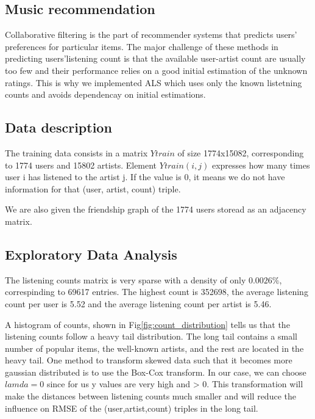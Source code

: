 \subsection{Music recommendation}
Collaborative filtering is the part of recommender systems that predicts users' preferences for particular items. The major challenge of these methods in predicting users'listening count is that the available user-artist count are usually too few and their performance relies on a good initial estimation of the unknown ratings. This is why we implemented ALS which uses only the known listetning counts and avoids dependencay on initial estimations.
\subsection{Data description}
The training data consists in a matrix $Ytrain$ of size 1774x15082, corresponding to 1774 users and 15802 artists. Element $Ytrain(i,j)$ expresses how many times user i has listened to the artist j. If the value is 0, it means we do not have information for that (user, artist, count) triple.

We are also given the friendship graph of the 1774 users storead as an adjacency matrix.

\subsection{Exploratory Data Analysis}

The listening counts matrix is very sparse with a density of only $0.0026\%$, correspinding to 
69617 entries.
The highest count is 352698, the average listening count per user is  5.52 and the average listening count per artist is 5.46.

A histogram of counts, shown in Fig\ref{fig:count_distribution} tells us that the listening counts follow a heavy tail distribution.
The long tail contains a small number of popular items, the well-known
artists, and the rest are located in the heavy tail.
One method to transform skewed data such that it becomes more gaussian distributed is to use the Box-Cox transform. In our case, we can choose $lamda=0$ since for us  y values are very high and > 0. This transformation will make the distances between listening counts much smaller and will reduce the influence on RMSE of the (user,artist,count) triples in the long tail. 

